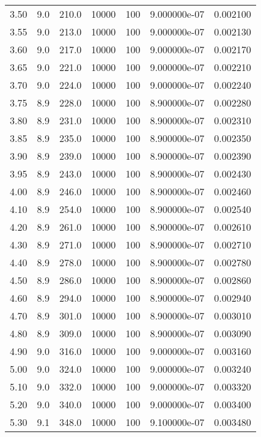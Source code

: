 \begin{tabular}{rrrrrrr}
  3.50 &      9.0 &    210.0 & 10000 & 100 & 9.000000e-07 & 0.002100 \\
  3.55 &      9.0 &    213.0 & 10000 & 100 & 9.000000e-07 & 0.002130 \\
  3.60 &      9.0 &    217.0 & 10000 & 100 & 9.000000e-07 & 0.002170 \\
  3.65 &      9.0 &    221.0 & 10000 & 100 & 9.000000e-07 & 0.002210 \\
  3.70 &      9.0 &    224.0 & 10000 & 100 & 9.000000e-07 & 0.002240 \\
  3.75 &      8.9 &    228.0 & 10000 & 100 & 8.900000e-07 & 0.002280 \\
  3.80 &      8.9 &    231.0 & 10000 & 100 & 8.900000e-07 & 0.002310 \\
  3.85 &      8.9 &    235.0 & 10000 & 100 & 8.900000e-07 & 0.002350 \\
  3.90 &      8.9 &    239.0 & 10000 & 100 & 8.900000e-07 & 0.002390 \\
  3.95 &      8.9 &    243.0 & 10000 & 100 & 8.900000e-07 & 0.002430 \\
  4.00 &      8.9 &    246.0 & 10000 & 100 & 8.900000e-07 & 0.002460 \\
  4.10 &      8.9 &    254.0 & 10000 & 100 & 8.900000e-07 & 0.002540 \\
  4.20 &      8.9 &    261.0 & 10000 & 100 & 8.900000e-07 & 0.002610 \\
  4.30 &      8.9 &    271.0 & 10000 & 100 & 8.900000e-07 & 0.002710 \\
  4.40 &      8.9 &    278.0 & 10000 & 100 & 8.900000e-07 & 0.002780 \\
  4.50 &      8.9 &    286.0 & 10000 & 100 & 8.900000e-07 & 0.002860 \\
  4.60 &      8.9 &    294.0 & 10000 & 100 & 8.900000e-07 & 0.002940 \\
  4.70 &      8.9 &    301.0 & 10000 & 100 & 8.900000e-07 & 0.003010 \\
  4.80 &      8.9 &    309.0 & 10000 & 100 & 8.900000e-07 & 0.003090 \\
  4.90 &      9.0 &    316.0 & 10000 & 100 & 9.000000e-07 & 0.003160 \\
  5.00 &      9.0 &    324.0 & 10000 & 100 & 9.000000e-07 & 0.003240 \\
  5.10 &      9.0 &    332.0 & 10000 & 100 & 9.000000e-07 & 0.003320 \\
  5.20 &      9.0 &    340.0 & 10000 & 100 & 9.000000e-07 & 0.003400 \\
  5.30 &      9.1 &    348.0 & 10000 & 100 & 9.100000e-07 & 0.003480 \\

\end{tabular}
